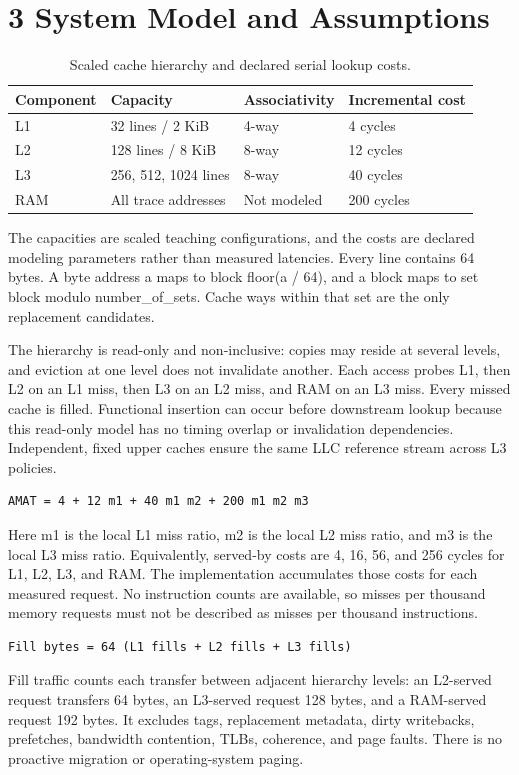 \documentclass[10pt,a4paper]{article}
\begin{document}
\section*{3 System Model and Assumptions}
\begin{table}[htbp]\centering\small
\caption{Scaled cache hierarchy and declared serial lookup costs.}
\begin{tabularx}{\linewidth}{XXXX}
\toprule
Component & Capacity & Associativity & Incremental cost \\
\midrule
L1 & 32 lines / 2 KiB & 4-way & 4 cycles \\
L2 & 128 lines / 8 KiB & 8-way & 12 cycles \\
L3 & 256, 512, 1024 lines & 8-way & 40 cycles \\
RAM & All trace addresses & Not modeled & 200 cycles \\
\bottomrule
\end{tabularx}\end{table}
The capacities are scaled teaching configurations, and the costs are declared modeling parameters rather than measured latencies. Every line contains 64 bytes. A byte address a maps to block floor(a / 64), and a block maps to set block modulo number\_of\_sets. Cache ways within that set are the only replacement candidates.

The hierarchy is read-only and non-inclusive: copies may reside at several levels, and eviction at one level does not invalidate another. Each access probes L1, then L2 on an L1 miss, then L3 on an L2 miss, and RAM on an L3 miss. Every missed cache is filled. Functional insertion can occur before downstream lookup because this read-only model has no timing overlap or invalidation dependencies. Independent, fixed upper caches ensure the same LLC reference stream across L3 policies.

\begin{verbatim}
AMAT = 4 + 12 m1 + 40 m1 m2 + 200 m1 m2 m3
\end{verbatim}
Here m1 is the local L1 miss ratio, m2 is the local L2 miss ratio, and m3 is the local L3 miss ratio. Equivalently, served-by costs are 4, 16, 56, and 256 cycles for L1, L2, L3, and RAM. The implementation accumulates those costs for each measured request. No instruction counts are available, so misses per thousand memory requests must not be described as misses per thousand instructions.

\begin{verbatim}
Fill bytes = 64 (L1 fills + L2 fills + L3 fills)
\end{verbatim}
Fill traffic counts each transfer between adjacent hierarchy levels: an L2-served request transfers 64 bytes, an L3-served request 128 bytes, and a RAM-served request 192 bytes. It excludes tags, replacement metadata, dirty writebacks, prefetches, bandwidth contention, TLBs, coherence, and page faults. There is no proactive migration or operating-system paging.
\end{document}
